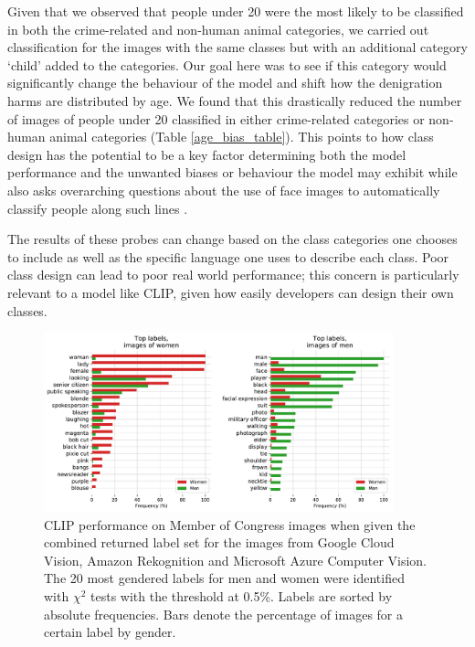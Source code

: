 \documentclass{article}
\begin{document}
Given that we observed that people under 20 were the most likely to be classified in both the crime-related and non-human animal categories, we carried out classification for the images with the same classes but with an additional category `child' added to the categories. Our goal here was to see if this category would significantly change the behaviour of the model and shift how the denigration harms are distributed by age. We found that this drastically reduced the number of images of people under 20 classified in either crime-related categories or non-human animal categories (Table \ref{age_bias_table}). This points to how class design has the potential to be a key factor determining both the model performance and the unwanted biases or behaviour the model may exhibit while also asks overarching questions about the use of face images to automatically classify people along such lines \citep{Arcas2017}. 



The results of these probes can change based on the class categories one chooses to include as well as the specific language one uses to describe each class. Poor class design can lead to poor real world performance; this concern is particularly relevant to a model like CLIP, given how easily developers can design their own classes. 


\begin{figure}[ht]
\begin{center}
\centerline{\includegraphics[width=0.9\textwidth]{women_career.pdf}}
\caption{CLIP performance on Member of Congress images when given the combined returned label set for the images from Google Cloud Vision, Amazon Rekognition and Microsoft Azure Computer Vision. The 20 most gendered labels for men and women were identified with $\chi^2$ tests with the threshold at 0.5\%. Labels are sorted by absolute frequencies. Bars denote the percentage of images for a certain label by gender.}
\label{clip_congress_labels}
\end{center}
\end{figure}
\end{document}
